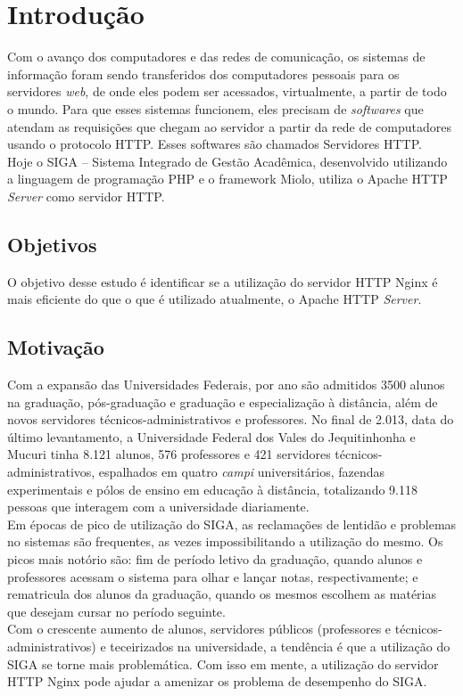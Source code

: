 \chapter{Introdução}\label{introducao}
Com o avanço dos computadores e das redes de comunicação, os sistemas de informação foram sendo transferidos dos computadores pessoais para os servidores \textit{web}, de onde eles podem ser acessados, virtualmente, a partir de todo o mundo. Para que esses sistemas funcionem, eles precisam de \textit{softwares} que atendam as requisições que chegam ao servidor a partir da rede de computadores usando o protocolo HTTP. Esses softwares são chamados Servidores HTTP.\\
Hoje o SIGA – Sistema Integrado de Gestão Acadêmica, desenvolvido utilizando a linguagem de programação PHP e o framework Miolo, utiliza o Apache HTTP \textit{Server} como servidor HTTP.\\

\section{Objetivos}
O objetivo desse estudo é identificar se a utilização do servidor HTTP Nginx é mais eficiente do que o que é utilizado atualmente, o Apache HTTP \textit{Server}.\\

\section{Motivação}
Com a expansão das Universidades Federais, por ano são admitidos 3500 alunos na graduação, pós-graduação e graduação e especialização à distância, além de novos servidores técnicos-administrativos e professores. No final de 2.013, data do último levantamento, a Universidade Federal dos Vales do Jequitinhonha e Mucuri tinha 8.121 alunos, 576 professores e 421 servidores técnicos-administrativos, espalhados em quatro \textit{campi} universitários, fazendas experimentais e pólos de ensino em educação à distância, totalizando 9.118 pessoas que interagem com a universidade diariamente.\\
Em épocas de pico de utilização do SIGA, as reclamações de lentidão e problemas no sistemas são frequentes, as vezes impossibilitando a utilização do mesmo. Os picos mais notório são: fim de período letivo da graduação, quando alunos e professores acessam o sistema para olhar e lançar notas, respectivamente; e rematricula dos alunos da graduação, quando os mesmos escolhem as matérias que desejam cursar no período seguinte.\\
Com o crescente aumento de alunos, servidores públicos (professores e técnicos-administrativos) e teceirizados na universidade, a tendência é que a utilização do SIGA se torne mais problemática.
Com isso em mente, a utilização do servidor HTTP Nginx pode ajudar a amenizar os problema de desempenho do SIGA.\\

